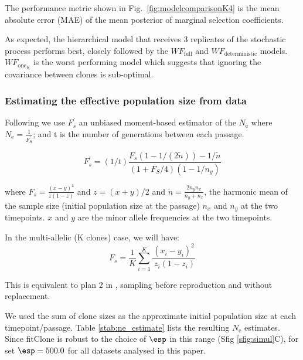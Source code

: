 \documentclass{article}
\newcommand{\eps}{N_\text{e}}
\begin{document}
The performance metric shown in Fig.\ \ref{fig:modelcomparisonK4} is the mean absolute error (MAE) of the mean posterior of marginal selection coefficients. 

As expected, the hierarchical model that receives 3 replicates of the stochastic process performs best, closely followed by the $WF_{\text{full}}$ and $WF_{\text{deterministic}}$ models. 
$WF_{\text{one}_K}$ is the worst performing model which suggests that ignoring the covariance between clones is sub-optimal.



\subsubsection{Estimating the effective population size from data}
\label{ssec:estimate_ne}

Following \cite{jorde1999estimating} we use $F^{'}_{s}$ an unbiased moment-based estimator of the $\eps$ where $\eps = \frac{1}{F^{'}_{S}}$; and t is the number of generations between each passage.

\begin{equation} \label{eq:fsprime}
F^{'}_{s} = (1/t) \frac{F_s (1 - 1/(2\tilde{n})) - 1/\tilde{n}}{(1+F_S/4)(1-1/n_y)}
\end{equation}

where 
$ F_s = \frac{(x-y)^2}{z(1-z)} $  and $z = (x+y)/2$ and $\tilde{n} = \frac{2n_{y}n_{x}}{n_y + n_x}$, the harmonic mean of the sample size (initial population size at the passage) $n_x$
and $n_y$ at the two timepoints. 
$x$ and $y$ are the minor allele frequencies at the two timepoints.

In the multi-allelic (K clones) case, we will have:
\[
F_s = \frac{1}{K} \sum_{i=1}^K \frac{ (x_i -y_i)^2}{\ z_i (1-z_i)}
\]

This is equivalent to plan 2 in \cite{jorde1999estimating}, sampling before reproduction and without replacement. 

We used the sum of clone sizes as the approximate initial population size at each timepoint/passage. 
Table \ref{stab:ne_estimate} lists the resulting $\eps$ estimates.
Since fitClone is robust to the choice of $\esp$ in this range (Sfig \ref{sfig:simul}C), for set $\esp = 500.0$ for all datasets analysed in this paper. 
\end{document}

